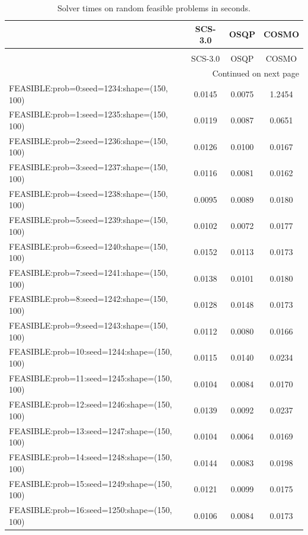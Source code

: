 \begin{longtable}{lccc}
\caption{Solver times on random feasible problems in seconds.}
\label{t-random feasible-results}\\
\toprule
{} &  SCS-3.0 &   OSQP &  COSMO \\
\midrule
\endfirsthead
\caption[]{Solver times on random feasible problems in seconds.} \\
\toprule
{} &  SCS-3.0 &   OSQP &  COSMO \\
\midrule
\endhead
\midrule
\multicolumn{4}{r}{{Continued on next page}} \\
\midrule
\endfoot

\bottomrule
\endlastfoot
FEASIBLE:prob=0:seed=1234:shape=(150, 100)   &   0.0145 & 0.0075 & 1.2454 \\
FEASIBLE:prob=1:seed=1235:shape=(150, 100)   &   0.0119 & 0.0087 & 0.0651 \\
FEASIBLE:prob=2:seed=1236:shape=(150, 100)   &   0.0126 & 0.0100 & 0.0167 \\
FEASIBLE:prob=3:seed=1237:shape=(150, 100)   &   0.0116 & 0.0081 & 0.0162 \\
FEASIBLE:prob=4:seed=1238:shape=(150, 100)   &   0.0095 & 0.0089 & 0.0180 \\
FEASIBLE:prob=5:seed=1239:shape=(150, 100)   &   0.0102 & 0.0072 & 0.0177 \\
FEASIBLE:prob=6:seed=1240:shape=(150, 100)   &   0.0152 & 0.0113 & 0.0173 \\
FEASIBLE:prob=7:seed=1241:shape=(150, 100)   &   0.0138 & 0.0101 & 0.0180 \\
FEASIBLE:prob=8:seed=1242:shape=(150, 100)   &   0.0128 & 0.0148 & 0.0173 \\
FEASIBLE:prob=9:seed=1243:shape=(150, 100)   &   0.0112 & 0.0080 & 0.0166 \\
FEASIBLE:prob=10:seed=1244:shape=(150, 100)  &   0.0115 & 0.0140 & 0.0234 \\
FEASIBLE:prob=11:seed=1245:shape=(150, 100)  &   0.0104 & 0.0084 & 0.0170 \\
FEASIBLE:prob=12:seed=1246:shape=(150, 100)  &   0.0139 & 0.0092 & 0.0237 \\
FEASIBLE:prob=13:seed=1247:shape=(150, 100)  &   0.0104 & 0.0064 & 0.0169 \\
FEASIBLE:prob=14:seed=1248:shape=(150, 100)  &   0.0144 & 0.0083 & 0.0198 \\
FEASIBLE:prob=15:seed=1249:shape=(150, 100)  &   0.0121 & 0.0099 & 0.0175 \\
FEASIBLE:prob=16:seed=1250:shape=(150, 100)  &   0.0106 & 0.0084 & 0.0173 \\

\end{longtable}
